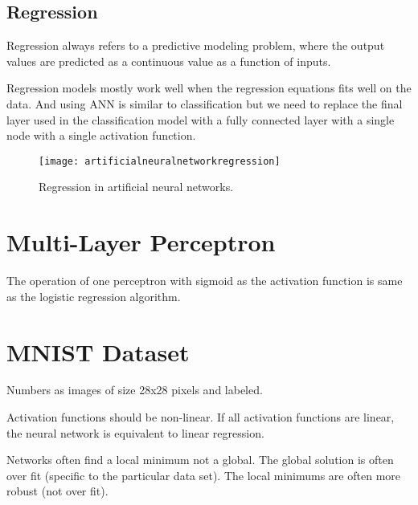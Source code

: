 	\subsection{Regression}
	\begin{bulletedlist}
		\item Regression always refers to a predictive modeling problem, where the output values are predicted as a continuous value as a function of inputs.
		\item Regression models mostly work well when the regression equations fits well on the data.  And using ANN is similar to classification but we need to replace the final layer used in the classification model with a fully connected layer with a single node with a single activation function.
	\end{bulletedlist}
 	\begin{figure}[h]
		\centering
		\texttt{[image: artificialneuralnetworkregression]}
		\caption[Regression in artificial neural networks]{Regression in artificial neural networks.}
		\label{fig:artificialneuralnetworkregression}
	\end{figure}

	\section{Multi-Layer Perceptron}

	\begin{bulletedlist}
		\item The operation of one perceptron with sigmoid as the activation function is same as the logistic regression algorithm.
	\end{bulletedlist}

	\section{MNIST Dataset}
	\begin{bulletedlist}
		\item Numbers as images of size 28x28 pixels and labeled.
		\item Activation functions should be non-linear.  If all activation functions are linear, the neural network is equivalent to linear regression.
		\item Networks often find a local minimum not a global.  The global solution is often over fit (specific to the particular data set).  The local minimums are often more robust (not over fit).
	\end{bulletedlist}


